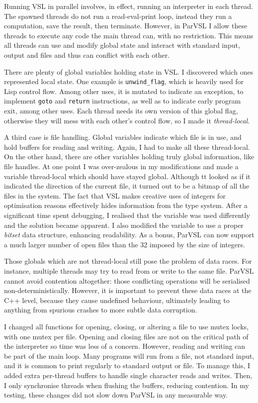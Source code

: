 Running VSL in parallel involves, in effect, running an interpreter in each thread. The spawned threads do not
run a read-eval-print loop, instead they run a computation, save the result, then terminate. However,
in ParVSL I allow these threads to execute any code the main thread can, with no restriction. This means
all threads can use and modify global state and interact with standard input, output and files and
thus can conflict with each other.

There are plenty of global variables holding state in VSL. I discovered which ones represented local
state.
One example is \verb|unwind_flag|, which is heavily used for Lisp control flow. Among other uses, it is
mutated to indicate an exception, to implement \verb|goto| and \verb|return| instructions,
as well as to indicate early program exit,
among other uses. Each thread needs its own version of this global flag, otherwise they will mess with each
other's control flow, so I made it \emph{thread-local}.

A third case is file handling. Global variables indicate which file is in use, and hold buffers for reading
and writing. Again, I had to make all these thread-local. On the other hand, there are other variables holding
truly global information, like file handles. At one point I was over-zealous in
my modifications and made a variable thread-local which should have stayed global. Although tt looked as if it indicated
the direction of the current file, it turned out to be a bitmap of all the files in the system. The fact
that VSL makes creative uses of integers for optimisation reasons effectively hides information from the type system.
After a significant time spent debugging, I realised that the variable was used differently and the solution became apparent.
I also modified the variable to use a proper \emph{bitset} data structure, enhancing readability.
As a bonus, ParVSL can now support a much larger number of open files than the 32 imposed by the size of integers.

Those globals which are not thread-local still pose the problem of data races. For instance, multiple threads
may try to read from or write to the same file. ParVSL cannot avoid contention altogether: those conflicting
operations will be serialised non-deterministically. However, it is important to prevent these data races at
the C++ level, because they cause undefined behaviour, ultimately leading to anything from spurious crashes
to more subtle data corruption.

I changed all functions for opening, closing, or altering a file to use mutex locks, with one mutex per file.
Opening and closing files are not on the critical path of the interpreter so time was less of a concern.
However, reading and writing can be part of the main loop. Many programs will run from a file, not standard input,
and it is common to print regularly to standard output or file. To manage this, I added extra per-thread buffers
to handle single character reads and writes. Then, I only synchronise threads when flushing the buffers, reducing
contention. In my testing, these changes did not slow down ParVSL in any measurable way.


